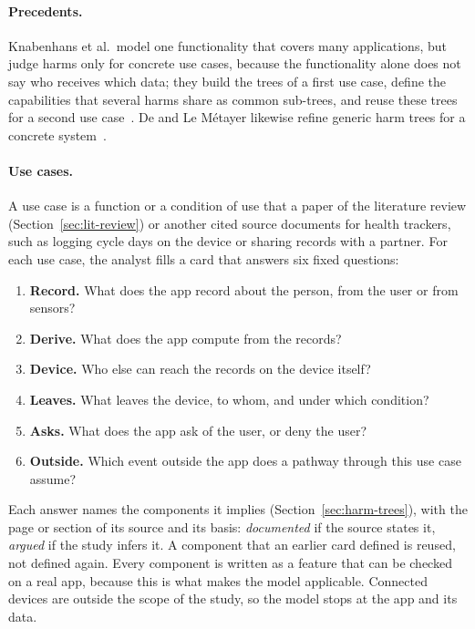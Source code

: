 \paragraph{Precedents.} Knabenhans et al.\ model one functionality that covers many
applications, but judge harms only for concrete use cases, because the functionality alone does
not say who receives which data; they build the trees of a first use case, define the
capabilities that several harms share as common sub-trees, and reuse these trees for a second use
case~\parencite[\S\S4, 4.2--4.3]{knabenhans2026harms}. De and Le Métayer likewise refine generic
harm trees for a concrete system~\parencite[\S\S3, 4.6, 5.4]{de2017refinement}.

\paragraph{Use cases.} A use case is a function or a condition of use that a paper of the
literature review (Section~\ref{sec:lit-review}) or another cited source documents for health
trackers, such as logging cycle days on the device or sharing records with a partner. For each
use case, the analyst fills a card that answers six fixed questions:
\begin{enumerate}[itemsep=1pt,topsep=3pt]
  \item \textbf{Record.} What does the app record about the person, from the user or from sensors?
  \item \textbf{Derive.} What does the app compute from the records?
  \item \textbf{Device.} Who else can reach the records on the device itself?
  \item \textbf{Leaves.} What leaves the device, to whom, and under which condition?
  \item \textbf{Asks.} What does the app ask of the user, or deny the user?
  \item \textbf{Outside.} Which event outside the app does a pathway through this use case assume?
\end{enumerate}
Each answer names the components it implies (Section~\ref{sec:harm-trees}), with the page or
section of its source and its basis: \emph{documented} if the source states it, \emph{argued} if
the study infers it. A component that an earlier card defined is reused, not defined again.
Every component is written as a feature that can be checked on a real app, because this is what
makes the model applicable. Connected devices are outside the scope of the study, so the model
stops at the app and its data.

